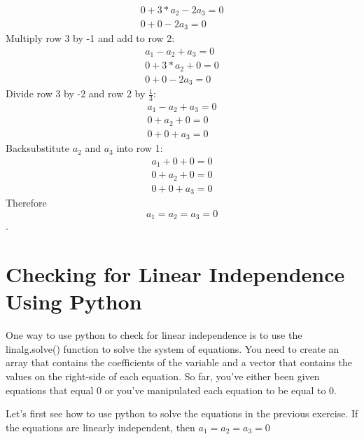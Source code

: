 \begin{Answer}[ref=vector_independence]
$$\begin{matrix}
			0 + 3*a_2 -2a_3 = 0 \\
			0 + 0 - 2a_3 = 0
		  \end{matrix} $$
	Multiply row 3 by -1 and add to row 2:
		$$\begin{matrix}
			a_1 - a_2 + a_3 = 0 \\
			0 + 3*a_2 + 0 = 0 \\
			0 + 0 - 2a_3 = 0
		\end{matrix} $$
    Divide row 3 by -2 and row 2 by $\frac{1}{3}$:
    	$$\begin{matrix}
			a_1 - a_2 + a_3 = 0 \\
			0 +  a_2 +0  = 0 \\
			0  + 0  + a_3 = 0
		\end{matrix} $$
	Backsubstitute $a_2$ and $a_3$ into row 1:
	 	$$\begin{matrix}
			a_1 + 0 + 0 = 0 \\
			0 +  a_2 + 0   = 0 \\
			0   + 0  + a_3 = 0
		\end{matrix} $$
	 Therefore $$a_1 = a_2 = a_3 = 0$$.
\end{Answer}
    
\section{Checking for Linear Independence Using Python}  
One way to use python to check for linear independence is to use the linalg.solve() function to solve the system of equations. You need to create an array that contains the coefficients of the variable and a vector that contains the values on the right-side of each equation. So far, you've either been given equations that equal 0 or you've manipulated each equation to be equal to 0. 

Let's first see how to use python to solve the equations in the previous exercise. If the equations are linearly independent, then $a_1 = a_2 = a_3 = 0$

